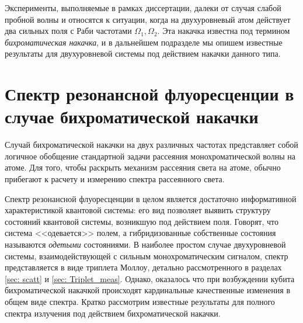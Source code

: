 Эксперименты, выполняемые в рамках диссертации, далеки от случая слабой пробной волны и относятся к ситуации, когда на двухуровневый атом действует два сильных поля с Раби частотами $\Omega_1, \Omega_2$. Эта накачка известна под термином \textit{бихроматическая накачка}, и в дальнейшем подразделе мы опишем известные результаты для двухуровневой системы под действием накачки данного типа. 

\section{Спектр резонансной флуоресценции в случае бихроматической накачки}

Случай бихроматической накачки на двух различных частотах представляет собой логичное обобщение стандартной задачи рассеяния монохроматической волны на атоме. Для того, чтобы раскрыть механизм рассеяния света на атоме, обычно прибегают к расчету и измерению спектра рассеянного света.

Спектр резонансной флуоресценции в целом является достаточно информативной характеристикой квантовой системы: его вид позволяет выявить структуру состояний квантовой системы, возникшую под действием поля. Говорят, что система <<одевается>> полем, а гибридизованные собственные состояния называются \textit{одетыми} состояниями. В наиболее простом случае двухуровневой системы, взаимодействующей с сильным монохроматическим сигналом, спектр представляется в виде триплета Моллоу, детально рассмотренного в разделах \ref{sec: scatt} и \ref{sec: Triplet_meas}. Однако, оказалось что при возбуждении кубита бихроматической накачкой происходят кардинальные качественные изменения в общем виде спектра. Кратко рассмотрим известные результаты для полного спектра излучения под действием бихроматической накачки. 


